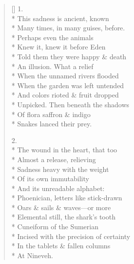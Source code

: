 \label{ch:ancient_music}
\settowidth{\versewidth}{Horns of the bison, also dying, never released}
\begin{verse}[\versewidth]
1.\\*
This sadness is ancient, known\\*
Many times, in many guises, before.\\*
Perhaps even the animals \\*
Knew it, knew it before Eden\\*
Told them they were happy \& death\\*
An illusion. What a relief\\*
When the unnamed rivers flooded\\*
When the garden was left untended\\*
And colors rioted \& fruit dropped\\*
Unpicked. Then beneath the shadows\\*
Of flora saffron \& indigo\\*
Snakes lanced their prey.





























2.\\*
The wound in the heart, that too\\*
Almost a release, relieving\\*
Sadness heavy with the weight\\*
Of its own immutability\\*
And its unreadable alphabet:\\*
Phoenician, letters like stick-drawn\\*
Oars \& sails \& waves---or more\\*
Elemental still, the shark's tooth\\*
Cuneiform of the Sumerian\\*
Incised with the precision of certainty\\*
In the tablets \& fallen columns\\*
At Nineveh.






























\end{verse}
